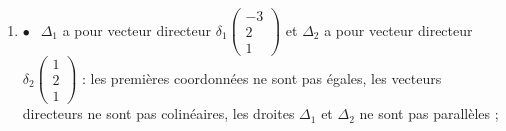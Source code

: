 \begin{enumerate}
\item %
$\bullet~~$ $\Delta_1$ a pour vecteur directeur $\delta_1\begin{pmatrix}-3\\2\\1\end{pmatrix}$ et $\Delta_2$ a pour vecteur directeur $\delta_2\begin{pmatrix}1\\2\\1\end{pmatrix}$ : les premières coordonnées ne sont pas égales, les vecteurs directeurs ne sont pas colinéaires, les droites $\Delta_1$ et $\Delta_2$ ne sont pas parallèles ; 

%
%


\end{enumerate}
